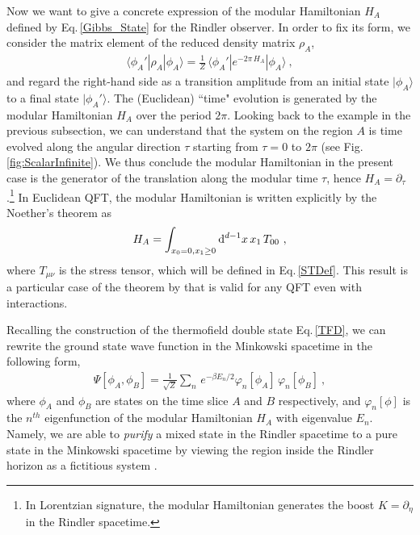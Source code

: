Now we want to give a concrete expression of the modular Hamiltonian $H_A$ defined by Eq.\,\eqref{Gibbs_State} for the Rindler observer.
In order to fix its form, we consider the matrix element of the reduced density matrix $\rho_A$,
\begin{align}
	\langle \phi_A' | \rho_A | \phi_A \rangle = \frac{1}{Z}\, \langle \phi_A' | e^{-2\pi\, H_A} | \phi_A \rangle  \ ,
\end{align}
and regard the right-hand side as a transition amplitude from an initial state $|\phi_A\rangle$ to a final state $|\phi_A'\rangle$.
The (Euclidean) ``time" evolution is generated by the modular Hamiltonian $H_A$ over the period $2\pi$.
Looking back to the example in the previous subsection, we can understand that the system on the region $A$ is time evolved along the angular direction $\tau$ starting from $\tau=0$ to $2\pi$ (see Fig.\,\ref{fig:ScalarInfinite}).
We thus conclude the modular Hamiltonian in the present case is the generator of the translation along the modular time $\tau$, hence $H_A = \partial_\tau$.\footnote{In Lorentzian signature, the modular Hamiltonian generates the boost $K = \partial_\eta$ in the Rindler spacetime.}
In Euclidean QFT, the modular Hamiltonian is written explicitly by the Noether's theorem as
\begin{align}\label{Modular_Hamiltonian}
	H_A = \int_{x_0=0, x_1\ge 0} \mathrm{d}^{d-1}x\, x_1\, T_{00} \ ,
\end{align}
where $T_{\mu\nu}$ is the stress tensor, which will be defined in Eq.\,\eqref{STDef}.
This result is a particular case of the theorem by \textcite{Bisognano:1976za,Bisognano:1975ih} that is valid for any QFT even with interactions.


Recalling the construction of the thermofield double state Eq.\,\eqref{TFD}, we can rewrite the ground state wave function in the Minkowski spacetime in the following form,
\begin{align}
		\Psi [\phi_A, \phi_B] = \frac{1}{\sqrt{Z}} \sum_{n}\,e^{-\beta E_n/2} \varphi_n [\phi_A]\, \varphi_n [\phi_B] \ ,
	\end{align}
where $\phi_A$ and $\phi_B$ are states on the time slice $A$ and $B$ respectively, and $\varphi_n [\phi]$ is the $n^{th}$ eigenfunction of the modular Hamiltonian $H_A$ with eigenvalue $E_n$.
Namely, we are able to \emph{purify} a mixed state in the Rindler spacetime  to a pure state in the Minkowski spacetime by viewing the region inside the Rindler horizon as a fictitious system \cite{Israel:1976ur,Laflamme:1988wg}.




